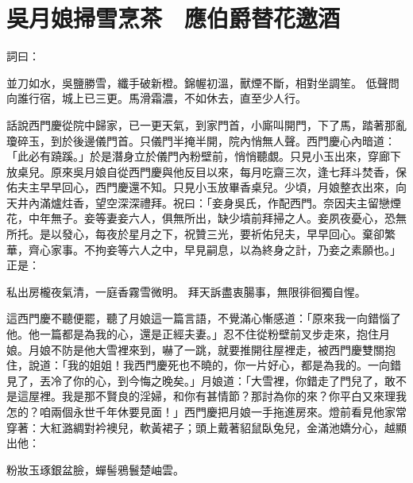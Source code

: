 %

\chapter{吳月娘掃雪烹茶　應伯爵替花邀酒}

詞曰：

並刀如水，吳鹽勝雪，纖手破新橙。錦幄初溫，獸煙不斷，相對坐調笙。
低聲問向誰行宿，城上已三更。馬滑霜濃，不如休去，直至少人行。

話說西門慶從院中歸家，已一更天氣，到家門首，小廝叫開門，下了馬，踏著那亂瓊碎玉，到於後邊儀門首。只儀門半掩半開，院內悄無人聲。西門慶心內暗道： 「此必有蹺蹊。」於是潛身立於儀門內粉壁前，悄悄聽覷。只見小玉出來，穿廊下放桌兒。原來吳月娘自從西門慶與他反目以來，每月吃齋三次，逢七拜斗焚香，保佑夫主早早回心，西門慶還不知。只見小玉放畢香桌兒。少頃，月娘整衣出來，向天井內滿爐炷香，望空深深禮拜。祝曰：「妾身吳氏，作配西門。奈因夫主留戀煙花，中年無子。妾等妻妾六人，俱無所出，缺少墳前拜掃之人。妾夙夜憂心，恐無所托。是以發心，每夜於星月之下，祝贊三光，要祈佑兒夫，早早回心。棄卻繁華，齊心家事。不拘妾等六人之中，早見嗣息，以為終身之計，乃妾之素願也。」正是：

私出房櫳夜氣清，一庭香霧雪微明。
拜天訴盡衷腸事，無限徘徊獨自惺。

這西門慶不聽便罷，聽了月娘這一篇言語，不覺滿心慚感道：「原來我一向錯惱了他。他一篇都是為我的心，還是正經夫妻。」忍不住從粉壁前叉步走來，抱住月娘。月娘不防是他大雪裡來到，嚇了一跳，就要推開往屋裡走，被西門慶雙關抱住，說道：「我的姐姐！我西門慶死也不曉的，你一片好心，都是為我的。一向錯見了，丟冷了你的心，到今悔之晚矣。」月娘道：「大雪裡，你錯走了門兒了，敢不是這屋裡。我是那不賢良的淫婦，和你有甚情節？那討為你的來？你平白又來理我怎的？咱兩個永世千年休要見面！」西門慶把月娘一手拖進房來。燈前看見他家常穿著：大紅潞綢對衿襖兒，軟黃裙子；頭上戴著貂鼠臥兔兒，金滿池嬌分心，越顯出他：

粉妝玉琢銀盆臉，蟬髻鴉鬟楚岫雲。

